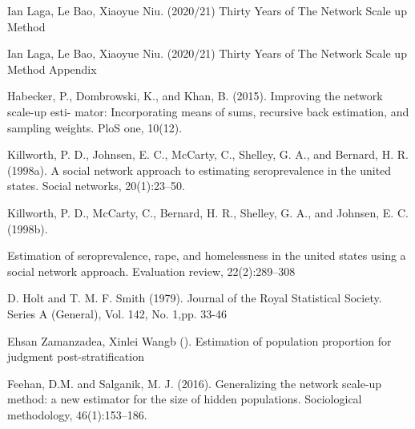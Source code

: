 \documentclass{article}
\begin{document}
\begin{thebibliography}{0}
  Ian Laga, Le Bao, Xiaoyue Niu. (2020/21) Thirty Years of The Network Scale up Method
  
 Ian Laga, Le Bao, Xiaoyue Niu. (2020/21) Thirty Years of The Network Scale up Method Appendix
  
 Habecker, P., Dombrowski, K., and Khan, B. (2015). Improving the network scale-up esti-
mator: Incorporating means of sums, recursive back estimation, and sampling weights.
PloS one, 10(12).

 Killworth, P. D., Johnsen, E. C., McCarty, C., Shelley, G. A., and Bernard, H. R. (1998a).
A social network approach to estimating seroprevalence in the united states. Social
networks, 20(1):23–50.

 Killworth, P. D., McCarty, C., Bernard, H. R., Shelley, G. A., and Johnsen, E. C. (1998b).

Estimation of seroprevalence, rape, and homelessness in the united states using a social
network approach. Evaluation review, 22(2):289–308

 D. Holt and T. M. F. Smith (1979). Journal of the Royal Statistical Society. Series A (General), Vol. 142, No. 1,pp. 33-46

Ehsan Zamanzadea, Xinlei Wangb (). Estimation of population proportion for judgment
post-stratification

 Feehan, D.M. and Salganik, M. J. (2016). Generalizing the network scale-up method: a new
estimator for the size of hidden populations. Sociological methodology, 46(1):153–186.

\end{thebibliography}
\end{document}
